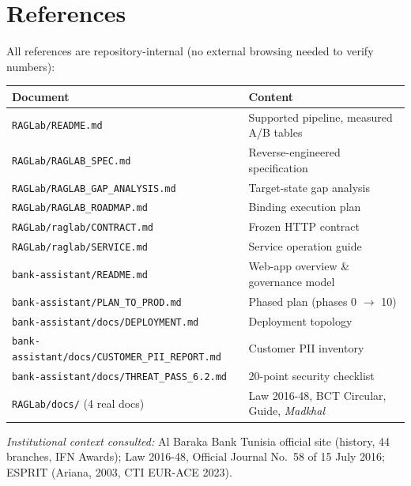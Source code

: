 \documentclass[a4paper,12pt]{report}
\begin{document}
\chapter*{References}
\small

All references are repository-internal (no external browsing needed to verify numbers):

\begin{table}[H]
\centering\footnotesize
\begin{tabular}{p{6.0cm}p{8.4cm}}
\toprule
\textbf{Document} & \textbf{Content} \\
\midrule
\texttt{RAGLab/README.md} & Supported pipeline, measured A/B tables \\
\texttt{RAGLab/RAGLAB\_SPEC.md} & Reverse-engineered specification \\
\texttt{RAGLab/RAGLAB\_GAP\_ANALYSIS.md} & Target-state gap analysis \\
\texttt{RAGLab/RAGLAB\_ROADMAP.md} & Binding execution plan \\
\texttt{RAGLab/raglab/CONTRACT.md} & Frozen HTTP contract \\
\texttt{RAGLab/raglab/SERVICE.md} & Service operation guide \\
\texttt{bank-assistant/README.md} & Web-app overview \& governance model \\
\texttt{bank-assistant/PLAN\_TO\_PROD.md} & Phased plan (phases 0 $\rightarrow$ 10) \\
\texttt{bank-assistant/docs/DEPLOYMENT.md} & Deployment topology \\
\texttt{bank-assistant/docs/CUSTOMER\_PII\_REPORT.md} & Customer PII inventory \\
\texttt{bank-assistant/docs/THREAT\_PASS\_6.2.md} & 20-point security checklist \\
\texttt{RAGLab/docs/} (4 real docs) & Law 2016-48, BCT Circular, Guide, \textit{Madkhal} \\
\bottomrule
\end{tabular}
\end{table}

\noindent\textit{Institutional context consulted:} Al Baraka Bank Tunisia official site (history, 44 branches, IFN Awards); Law 2016-48, Official Journal No.\ 58 of 15 July 2016; ESPRIT (Ariana, 2003, CTI EUR-ACE 2023).

\appendix
\end{document}
